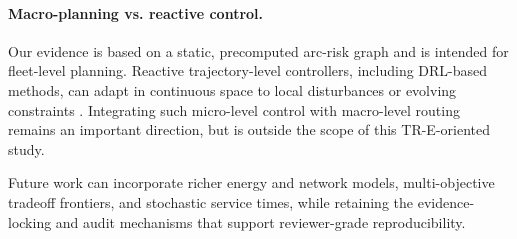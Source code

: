 \paragraph{Macro-planning vs. reactive control.}
Our evidence is based on a static, precomputed arc-risk graph and is intended for fleet-level planning. Reactive trajectory-level controllers, including DRL-based methods, can adapt in continuous space to local disturbances or evolving constraints \citep{huang2026tccn}. Integrating such micro-level control with macro-level routing remains an important direction, but is outside the scope of this TR-E-oriented study.

Future work can incorporate richer energy and network models, multi-objective tradeoff frontiers, and stochastic service times, while retaining the evidence-locking and audit mechanisms that support reviewer-grade reproducibility.

